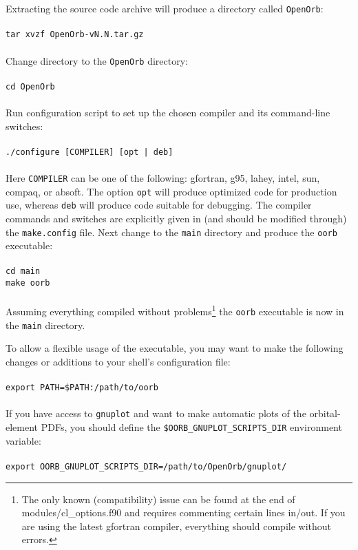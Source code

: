\documentclass[12pt,english,twoside,a4paper]{report}
\begin{document}
Extracting the source code archive will produce a directory called
\verb|OpenOrb|: \\ \\
\verb|tar xvzf OpenOrb-vN.N.tar.gz|\\ \\
Change directory to the \verb|OpenOrb| directory:\\ \\
\verb|cd OpenOrb|\\ \\
Run configuration script to set up the chosen compiler and its
command-line switches:\\ \\
\verb+./configure [COMPILER] [opt | deb]+\\ \\
Here \verb|COMPILER| can be one of the following: gfortran, g95,
lahey, intel, sun, compaq, or absoft. The option \verb|opt| will
produce optimized code for production use, whereas \verb|deb| will
produce code suitable for debugging. The compiler commands and
switches are explicitly given in (and should be modified through) the
\verb|make.config| file. Next change to the \verb|main| directory and
produce the \verb|oorb| executable: \\ \\
\verb|cd main| \\
\verb|make oorb| \\ \\
Assuming everything compiled without problems\footnote{The only known
  (compatibility) issue can be found at the end of
  \mbox{modules/cl\_options.f90} and requires commenting certain lines
  in/out. If you are using the latest gfortran compiler, everything
  should compile without errors.} the \verb|oorb| executable is now in
the \verb|main| directory.

To allow a flexible usage of the executable, you may want to make the
following changes or additions to your shell's configuration file: \\ \\ 
\verb|export PATH=$PATH:/path/to/oorb| \\ \\
If you have access to \verb|gnuplot| and want to make automatic plots
of the orbital-element PDFs, you should define the
\verb|$OORB_GNUPLOT_SCRIPTS_DIR| environment variable: \\ \\ 
\verb|export OORB_GNUPLOT_SCRIPTS_DIR=/path/to/OpenOrb/gnuplot/|
\end{document}

